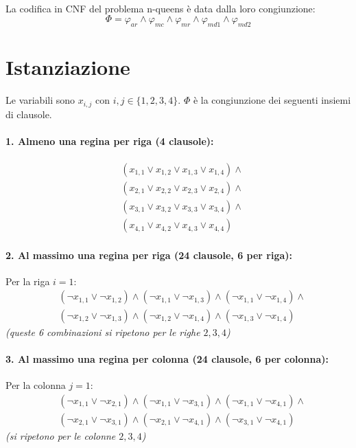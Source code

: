 \documentclass[10pt]{article}
\begin{document}
\paragraph{}

La codifica in CNF del problema n-queens è data dalla loro congiunzione:
$$\Phi = \varphi_{ar} \land \varphi_{mc} \land \varphi_{mr} \land \varphi_{md1} \land \varphi_{md2}$$

\section{Istanziazione}
Le variabili sono $x_{i,j}$ con $i, j \in \{1, 2, 3, 4\}$. $\Phi$ è la congiunzione dei seguenti insiemi di clausole.

\paragraph{1. Almeno una regina per riga (4 clausole):}
\[
\begin{aligned}
    & (x_{1,1} \lor x_{1,2} \lor x_{1,3} \lor x_{1,4}) \land \\
    & (x_{2,1} \lor x_{2,2} \lor x_{2,3} \lor x_{2,4}) \land \\
    & (x_{3,1} \lor x_{3,2} \lor x_{3,3} \lor x_{3,4}) \land \\
    & (x_{4,1} \lor x_{4,2} \lor x_{4,3} \lor x_{4,4})
\end{aligned}
\]

\paragraph{2. Al massimo una regina per riga (24 clausole, 6 per riga):}
Per la riga $i=1$:
\[
\begin{aligned}
    & (\neg x_{1,1} \lor \neg x_{1,2}) \land (\neg x_{1,1} \lor \neg x_{1,3}) \land (\neg x_{1,1} \lor \neg x_{1,4}) \land \\
    & (\neg x_{1,2} \lor \neg x_{1,3}) \land (\neg x_{1,2} \lor \neg x_{1,4}) \land (\neg x_{1,3} \lor \neg x_{1,4})
\end{aligned}
\]
\textit{(queste 6 combinazioni si ripetono per le righe $2, 3, 4$)}

\paragraph{3. Al massimo una regina per colonna (24 clausole, 6 per colonna):}
Per la colonna $j=1$:
\[
\begin{aligned}
    & (\neg x_{1,1} \lor \neg x_{2,1}) \land (\neg x_{1,1} \lor \neg x_{3,1}) \land (\neg x_{1,1} \lor \neg x_{4,1}) \land \\
    & (\neg x_{2,1} \lor \neg x_{3,1}) \land (\neg x_{2,1} \lor \neg x_{4,1}) \land (\neg x_{3,1} \lor \neg x_{4,1})
\end{aligned}
\]
\textit{(si ripetono per le colonne $2, 3, 4$)}
\end{document}
